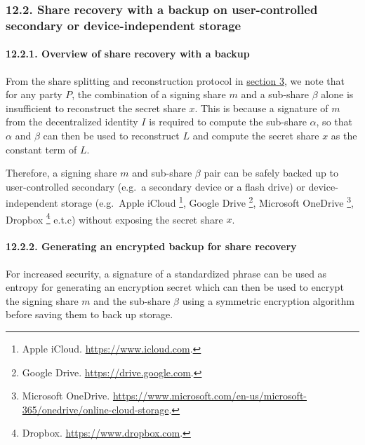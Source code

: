 \documentclass[
]{article}
\begin{document}
\hypertarget{share-recovery-backup}{%
\subsubsection{12.2. Share recovery with a backup on user-controlled
secondary or device-independent storage}\label{share-recovery-backup}}

\hypertarget{share-recovery-backup-overview}{%
\paragraph{12.2.1. Overview of share recovery with a
backup}\label{share-recovery-backup-overview}}

From the share splitting and reconstruction protocol in
\protect\hyperlink{share-splitting-and-reconstruction}{section 3}, we
note that for any party \(P\), the combination of a signing share \(m\)
and a sub-share \(\beta\) alone is insufficient to reconstruct the
secret share \(x\). This is because a signature of \(m\) from the
decentralized identity \(I\) is required to compute the sub-share
\(\alpha\), so that \(\alpha\) and \(\beta\) can then be used to
reconstruct \(L\) and compute the secret share \(x\) as the constant
term of \(L\).

Therefore, a signing share \(m\) and sub-share \(\beta\) pair can be
safely backed up to user-controlled secondary (e.g.~a secondary device
or a flash drive) or device-independent storage (e.g.~Apple iCloud
\footnote{Apple iCloud. \url{https://www.icloud.com}.}, Google Drive
\footnote{Google Drive. \url{https://drive.google.com}.}, Microsoft
OneDrive \footnote{Microsoft OneDrive.
  \url{https://www.microsoft.com/en-us/microsoft-365/onedrive/online-cloud-storage}.},
Dropbox \footnote{Dropbox. \url{https://www.dropbox.com}.} e.t.c)
without exposing the secret share \(x\).

\hypertarget{share-recovery-backup-encrypt}{%
\paragraph{12.2.2. Generating an encrypted backup for share
recovery}\label{share-recovery-backup-encrypt}}

For increased security, a signature of a standardized phrase can be used
as entropy for generating an encryption secret which can then be used to
encrypt the signing share \(m\) and the sub-share \(\beta\) using a
symmetric encryption algorithm before saving them to back up storage.
\end{document}
